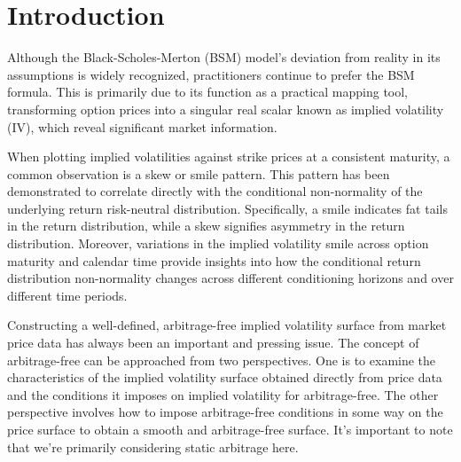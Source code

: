 \section{Introduction}
Although the Black-Scholes-Merton (BSM) model's deviation from reality in its assumptions is widely recognized, 
practitioners continue to prefer the BSM formula. This is primarily due to its 
function as a practical mapping tool, transforming option prices into a singular 
real scalar known as implied volatility (IV), which reveal significant market 
information.

When plotting implied volatilities against strike prices at a consistent 
maturity, a common observation is a skew or smile pattern. 
This pattern has been demonstrated to correlate directly with the conditional 
non-normality of the underlying return risk-neutral distribution. 
Specifically, a smile indicates fat tails in the return distribution, 
while a skew signifies asymmetry in the return distribution. 
Moreover, variations in the implied volatility smile across option maturity 
and calendar time provide insights into how the conditional return distribution 
non-normality changes across different conditioning horizons and over different time periods.

Constructing a well-defined, arbitrage-free implied volatility surface from market price data has always been an important and pressing issue.
The concept of arbitrage-free can be approached from two perspectives. 
One is to examine the characteristics of the implied volatility surface obtained directly from price data and the conditions it imposes on implied volatility for arbitrage-free. 
The other perspective involves how to impose arbitrage-free conditions in some way on the price surface to obtain a smooth and arbitrage-free surface. 
It's important to note that we're primarily considering static arbitrage here.
